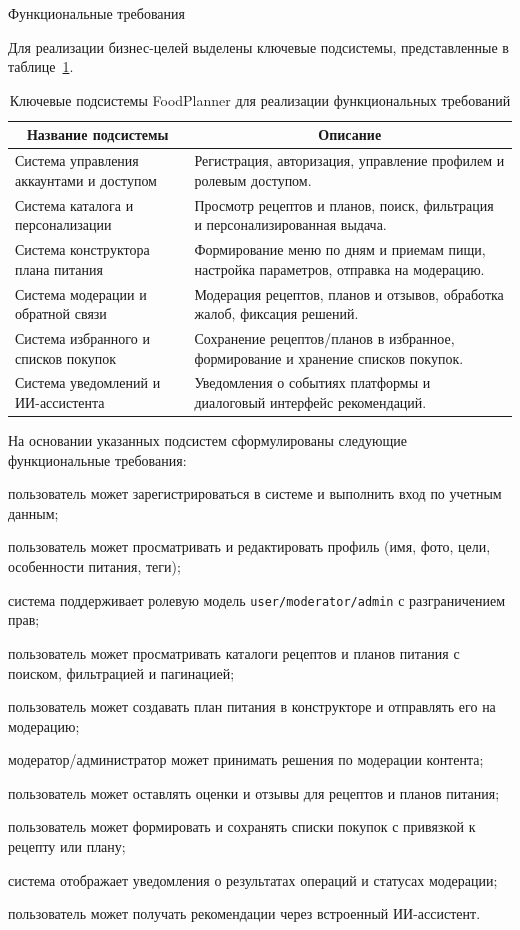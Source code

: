 Функциональные требования

Для реализации бизнес-целей выделены ключевые подсистемы, представленные в таблице~\ref{tab:subsystems-fp}.

\begin{table}[H]
\caption{Ключевые подсистемы FoodPlanner для реализации функциональных требований}
\label{tab:subsystems-fp}
\small
\begin{tabularx}{\textwidth}{|p{}|X|}
\hline
\multicolumn{1}{|c|}{Название подсистемы} & \multicolumn{1}{c|}{Описание} \\ \hline
Система управления аккаунтами и доступом & Регистрация, авторизация, управление профилем и ролевым доступом. \\ \hline
Система каталога и персонализации & Просмотр рецептов и планов, поиск, фильтрация и персонализированная выдача. \\ \hline
Система конструктора плана питания & Формирование меню по дням и приемам пищи, настройка параметров, отправка на модерацию. \\ \hline
Система модерации и обратной связи & Модерация рецептов, планов и отзывов, обработка жалоб, фиксация решений. \\ \hline
Система избранного и списков покупок & Сохранение рецептов/планов в избранное, формирование и хранение списков покупок. \\ \hline
Система уведомлений и ИИ-ассистента & Уведомления о событиях платформы и диалоговый интерфейс рекомендаций. \\ \hline
\end{tabularx}
\normalsize
\end{table}

На основании указанных подсистем сформулированы следующие функциональные требования:
\begin{compactlist}
  \item пользователь может зарегистрироваться в системе и выполнить вход по учетным данным;
  \item пользователь может просматривать и редактировать профиль (имя, фото, цели, особенности питания, теги);
  \item система поддерживает ролевую модель \texttt{user/moderator/admin} с разграничением прав;
  \item пользователь может просматривать каталоги рецептов и планов питания с поиском, фильтрацией и пагинацией;
  \item пользователь может создавать план питания в конструкторе и отправлять его на модерацию;
  \item модератор/администратор может принимать решения по модерации контента;
  \item пользователь может оставлять оценки и отзывы для рецептов и планов питания;
  \item пользователь может формировать и сохранять списки покупок с привязкой к рецепту или плану;
  \item система отображает уведомления о результатах операций и статусах модерации;
  \item пользователь может получать рекомендации через встроенный ИИ-ассистент.
\end{compactlist}

